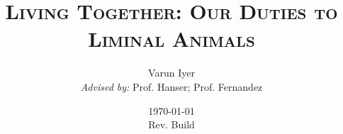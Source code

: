 \documentclass[12pt,oneside]{book}
\author{Varun Iyer \\ \emph{Advised by:} Prof. Hanser; Prof. Fernandez}
\date{\today \\ \footnotesize Rev. \texttt{} Build \texttt{}}
\title{\textsc{Living Together: Our Duties to Liminal Animals}}
\begin{document}
\maketitle
\tableofcontents





\nocite{*}
\printbibliography
\end{document}
